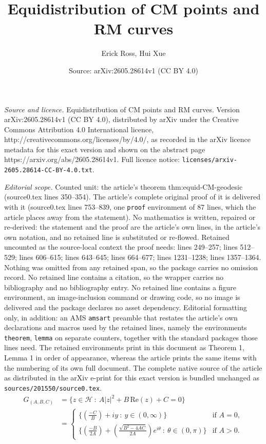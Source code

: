 \documentclass[10pt,a4paper]{amsart}
\title{Equidistribution of CM points and RM curves}
\author{Erick Ross, Hui Xue}
\date{Source: arXiv:2605.28614v1 (CC BY 4.0)}
\newcommand{\HH}{\mathcal{H}}
\newcommand{\lrp}[1]{\left(#1\right)}
\begin{document}
\maketitle

\noindent\emph{Source and licence.} Equidistribution of CM points and RM curves. Version arXiv:2605.28614v1 (CC BY 4.0), distributed by arXiv under the Creative Commons Attribution 4.0 International licence, http://creativecommons.org/licenses/by/4.0/, as recorded in the arXiv licence metadata for this exact version and shown on the abstract page https://arxiv.org/abs/2605.28614v1. Full licence notice: \texttt{licenses/arxiv-2605.28614-CC-BY-4.0.txt}.\par\smallskip

\noindent\textit{Editorial scope.} Counted unit: the article's theorem thm:equid-CM-geodesic (source0.tex lines 350--354). The article's complete original proof of it is delivered with it (source0.tex lines 753--839, one \texttt{proof} environment of 87 lines, which the article places away from the statement). No mathematics is written, repaired or re-derived: the statement and the proof are the article's own lines, in the article's own notation, and no retained line is substituted or re-flowed.  Retained uncounted as the source-local context the proof needs: lines 249--257; lines 512--529; lines 606--615; lines 643--645; lines 664--677; lines 1231--1238; lines 1357--1364.  Nothing was omitted from any retained span, so the package carries no omission record.  No retained line contains a citation, so the wrapper carries no bibliography and no bibliography entry.  No retained line contains a figure environment, an image-inclusion command or drawing code, so no image is delivered and the package declares no asset dependency.  Editorial formatting only, in addition: an AMS \texttt{amsart} preamble that restates the article's own declarations and macros used by the retained lines, namely the environments \texttt{theorem}, \texttt{lemma} on separate counters, together with the standard packages those lines need.  The retained environments print in this document as Theorem 1, Lemma 1 in order of appearance, whereas the article prints the same items with the numbering of its own full document.  The complete native source of the article as distributed in the arXiv e-print for this exact version is bundled unchanged as \texttt{sources/201550/source0.tex}.
\begin{align}
    G_{(A,B,C)}
    &= \{z \in \HH ~:~ A|z|^2+B\,\mathrm{Re}(z) + C = 0 \} \label{eqn:GABC-set-formula}\\
    &= 
    \begin{cases}
        \{\lrp{\frac{-C}{B}}+iy ~:~ y \in (0,\infty)\} & \text{if } A=0, \\
        \{\lrp{\frac{-B}{2A}} + \lrp{\frac{\sqrt{B^2-4AC}}{2A}}e^{i\theta} ~:~ \theta \in (0,\pi)\} & \text{if } A>0.
    \end{cases} 
\end{align}
\end{document}
